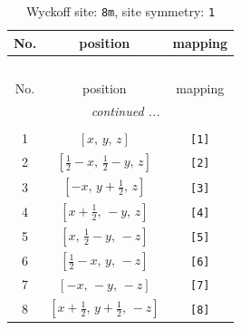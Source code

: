 \documentclass[fleqn,8pt]{jsarticle}
\begin{document}
\renewcommand{\arraystretch}{1.2}
\begin{longtable}{ccc}
\caption{Wyckoff site: {\tt 8m}, site symmetry: {\tt 1}}
 \\
 \hline \hline
No. & position & mapping \\ \hline \endfirsthead

\multicolumn{2}{l}{\tablename\ \thetable{}} \\
 \hline \hline
No. & position & mapping \\ \hline \endhead

 \hline \hline
\multicolumn{2}{r}{\footnotesize\it continued ...} \\ \endfoot

 \hline \hline
\multicolumn{2}{r}{} \\ \endlastfoot

1 & $\left[ x,\, y,\, z \right]$ & {\tt [1]} \\ \hline
2 & $\left[ \frac{1}{2} - x,\, \frac{1}{2} - y,\, z \right]$ & {\tt [2]} \\ \hline
3 & $\left[ - x,\, y + \frac{1}{2},\, z \right]$ & {\tt [3]} \\ \hline
4 & $\left[ x + \frac{1}{2},\, - y,\, z \right]$ & {\tt [4]} \\ \hline
5 & $\left[ x,\, \frac{1}{2} - y,\, - z \right]$ & {\tt [5]} \\ \hline
6 & $\left[ \frac{1}{2} - x,\, y,\, - z \right]$ & {\tt [6]} \\ \hline
7 & $\left[ - x,\, - y,\, - z \right]$ & {\tt [7]} \\ \hline
8 & $\left[ x + \frac{1}{2},\, y + \frac{1}{2},\, - z \right]$ & {\tt [8]} \\
\end{longtable}
\end{document}
